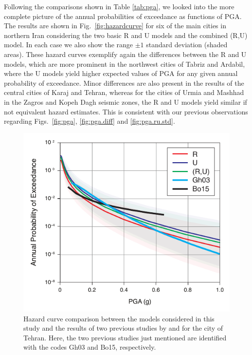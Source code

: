 
Following the comparisons shown in Table \ref{tab:pga}, we looked into the more complete picture of the annual probabilities of exceedance as functions of PGA. The results are shown in Fig.~\ref{fig:hazardcurve} for six of the main cities in northern Iran considering the two basic R and U models and the combined (R,U) model. In each case we also show the range $\pm 1$ standard deviation (shaded areas). These hazard curves exemplify again the differences between the R and U models, which are more prominent in the northwest cities of Tabriz and Ardabil, where the U models yield higher expected values of PGA for any given annual probability of exceedance. Minor differences are also present in the results of the central cities of Karaj and Tehran, whereas for the cities of Urmia and Mashhad in the Zagros and Kopeh Dagh seismic zones, the R and U models yield similar if not equivalent hazard estimates. This is consistent with our previous observations regarding Figs.~\ref{fig:pga}, \ref{fig:pga.diff} and \ref{fig:pga.ru.std}.

\begin{figure}[t]
    \centering
    \includegraphics[width=\columnwidth]{figures/pdf/figure-12} 
    \caption{Hazard curve comparison between the models considered in this study and the results of two previous studies by \citet{Ghodrati2003} and \citet{Boostan2015} for the city of Tehran. Here, the two previous studies just mentioned are identified with the codes Gh03 and Bo15, respectively.}
    \label{fig:tehran}
\end{figure}

